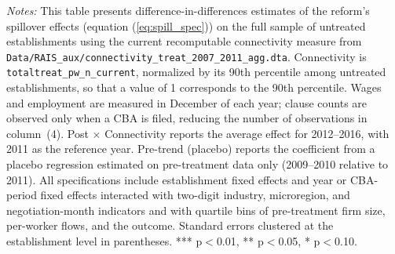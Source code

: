 \documentclass[11pt]{article}
\begin{document}
\begin{table}[H]
\begin{minipage}{\linewidth}
\scriptsize\vspace{4pt}
    \textit{Notes:} This table presents difference-in-differences estimates of the reform's spillover effects (equation (\ref{eq:spill_spec})) on the full sample of untreated establishments using the current recomputable connectivity measure from \texttt{Data/RAIS\_aux/connectivity\_treat\_2007\_2011\_agg.dta}. Connectivity is \texttt{totaltreat\_pw\_n\_current}, normalized by its 90th percentile among untreated establishments, so that a value of 1 corresponds to the 90th percentile. Wages and employment are measured in December of each year; clause counts are observed only when a CBA is filed, reducing the number of observations in column~(4). Post $\times$ Connectivity reports the average effect for 2012--2016, with 2011 as the reference year. Pre-trend (placebo) reports the coefficient from a placebo regression estimated on pre-treatment data only (2009--2010 relative to 2011). All specifications include establishment fixed effects and year or CBA-period fixed effects interacted with two-digit industry, microregion, and negotiation-month indicators and with quartile bins of pre-treatment firm size, per-worker flows, and the outcome. Standard errors clustered at the establishment level in parentheses. *** p$<$0.01, ** p$<$0.05, * p$<$0.10.
\end{minipage}
\end{table}
\end{document}
